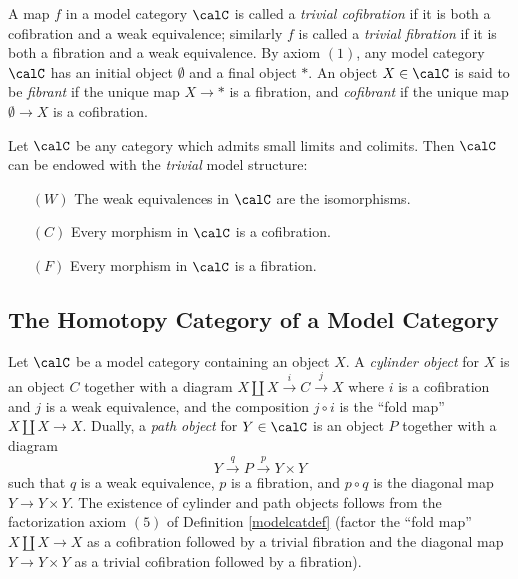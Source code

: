 A map $f$ in a model category $\calC$ is called a {\it trivial cofibration} if it is both a cofibration and a weak equivalence; similarly $f$ is called a {\it trivial fibration} if it is both a fibration and a weak equivalence. By axiom $(1)$, any model category $\calC$ has an initial object $\emptyset$
and a final object $\ast$. An object $X \in \calC$ is said to be {\it fibrant} if the unique map
$X \rightarrow \ast$ is a fibration, and {\it cofibrant} if the unique map $\emptyset \rightarrow X$ is a cofibration.

\begin{example}\label{trivmodel}
Let $\calC$ be any category which admits small limits and colimits. Then
$\calC$ can be endowed with the {\em trivial} model structure:
\begin{itemize}
\item[$(W)$] The weak equivalences in $\calC$ are the isomorphisms.
\item[$(C)$] Every morphism in $\calC$ is a cofibration.
\item[$(F)$] Every morphism in $\calC$ is a fibration. 
\end{itemize}
\end{example}

\subsection{The Homotopy Category of a Model Category}

Let $\calC$ be a model category containing an object $X$. A {\it cylinder object} for $X$
is an object $C$ together with a diagram
$ X \coprod X \stackrel{i}{\rightarrow} C \stackrel{j}{\rightarrow} X$
where $i$ is a cofibration and $j$ is a weak equivalence, and the composition $j \circ i$
is the ``fold map'' $X \coprod X \rightarrow X$. 
Dually, a {\it path object} for $Y \in \calC$ is an object $P$ together with a diagram $$Y \stackrel{q}{\rightarrow} P \stackrel{p}{\rightarrow} Y \times Y$$ such that $q$ is a weak equivalence, $p$ is a fibration, and $p \circ q$ is the diagonal map $Y \rightarrow Y \times Y$.
The existence of cylinder and path objects follows from the factorization axiom $(5)$ of Definition \ref{modelcatdef} (factor the ``fold map'' $X \coprod X \rightarrow X$ as a cofibration followed by a trivial fibration and the diagonal map $Y \rightarrow Y \times Y$ as a trivial cofibration followed by a fibration).

